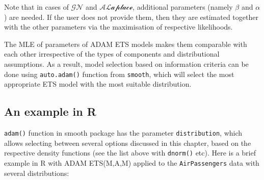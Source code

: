 \documentclass[
]{book}
\theoremstyle{definition}
\theoremstyle{definition}
\theoremstyle{definition}
\theoremstyle{definition}
\theoremstyle{remark}
\begin{document}
Note that in cases of \(\mathcal{GN}\) and \(\mathcal{ALaplace}\), additional parameters (namely \(\beta\) and \(\alpha\)) are needed. If the user does not provide them, then they are estimated together with the other parameters via the maximisation of respective likelihoods.

The MLE of parameters of ADAM ETS models makes them comparable with each other irrespective of the types of components and distributional assumptions. As a result, model selection based on information criteria can be done using \texttt{auto.adam()} function from \texttt{smooth}, which will select the most appropriate ETS model with the most suitable distribution.

\hypertarget{an-example-in-r-1}{%
\subsection{An example in R}\label{an-example-in-r-1}}

\texttt{adam()} function in smooth package has the parameter \texttt{distribution}, which allows selecting between several options discussed in this chapter, based on the respective density functions (see the list above with \texttt{dnorm()} etc). Here is a brief example in R with ADAM ETS(M,A,M) applied to the \texttt{AirPassengers} data with several distributions:
\end{document}
